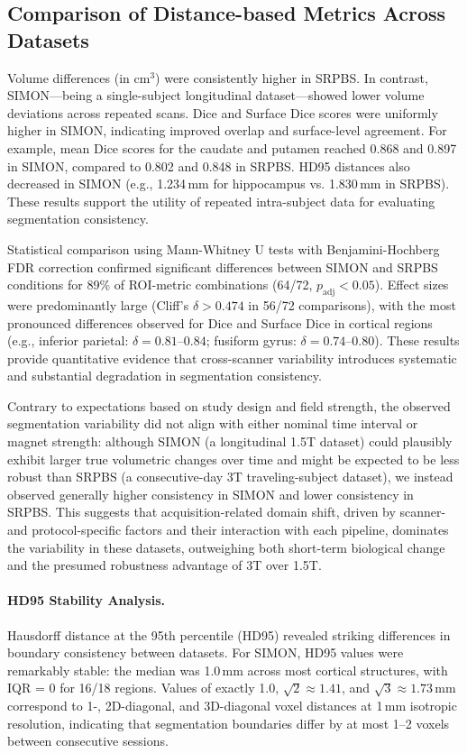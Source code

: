 \documentclass{midl} %
\begin{document}
\subsection{Comparison of Distance-based Metrics Across Datasets}

Volume differences (in cm$^3$) were consistently higher in SRPBS. In contrast, SIMON---being a single-subject longitudinal dataset---showed lower volume deviations across repeated scans. Dice and Surface Dice scores were uniformly higher in SIMON, indicating improved overlap and surface-level agreement. For example, mean Dice scores for the caudate and putamen reached 0.868 and 0.897 in SIMON, compared to 0.802 and 0.848 in SRPBS. HD95 distances also decreased in SIMON (e.g., 1.234\,mm for hippocampus vs. 1.830\,mm in SRPBS). These results support the utility of repeated intra-subject data for evaluating segmentation consistency.

Statistical comparison using Mann-Whitney U tests with Benjamini-Hochberg FDR correction confirmed significant differences between SIMON and SRPBS conditions for 89\% of ROI-metric combinations (64/72, $p_{\text{adj}} < 0.05$). Effect sizes were predominantly large (Cliff's $\delta > 0.474$ in 56/72 comparisons), with the most pronounced differences observed for Dice and Surface Dice in cortical regions (e.g., inferior parietal: $\delta = 0.81$--$0.84$; fusiform gyrus: $\delta = 0.74$--$0.80$). These results provide quantitative evidence that cross-scanner variability introduces systematic and substantial degradation in segmentation consistency. 

Contrary to expectations based on study design and field strength, the observed segmentation variability did not align with either nominal time interval or magnet strength: although SIMON (a longitudinal 1.5T dataset) could plausibly exhibit larger true volumetric changes over time and might be expected to be less robust than SRPBS (a consecutive-day 3T traveling-subject dataset), we instead observed generally higher consistency in SIMON and lower consistency in SRPBS. This suggests that acquisition-related domain shift, driven by scanner- and protocol-specific factors and their interaction with each pipeline, dominates the variability in these datasets, outweighing both short-term biological change and the presumed robustness advantage of 3T over 1.5T.

\paragraph{HD95 Stability Analysis.}
Hausdorff distance at the 95th percentile (HD95) revealed striking differences in boundary consistency between datasets. For SIMON, HD95 values were remarkably stable: the median was 1.0\,mm across most cortical structures, with IQR = 0 for 16/18 regions. Values of exactly 1.0, $\sqrt{2} \approx 1.41$, and $\sqrt{3} \approx 1.73$\,mm correspond to 1-, 2D-diagonal, and 3D-diagonal voxel distances at 1\,mm isotropic resolution, indicating that segmentation boundaries differ by at most 1--2 voxels between consecutive sessions.
\end{document}
